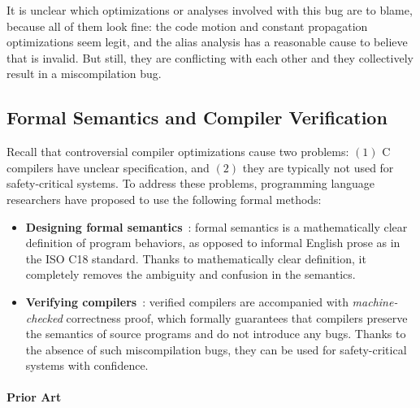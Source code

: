\noindent It is unclear which optimizations or analyses involved with this bug are to blame, because
all of them look fine: the code motion and constant propagation optimizations seem legit, and the
alias analysis has a reasonable cause to believe that  is invalid.  But still, they are
conflicting with each other and they collectively result in a miscompilation bug.



\subsection{Formal Semantics and Compiler Verification}

Recall that controversial compiler optimizations cause two problems: $(1)$ C compilers have unclear
specification, and $(2)$ they are typically not used for safety-critical systems.  To address these
problems, programming language researchers have proposed to use the following formal methods:

\begin{itemize}
\item \textbf{Designing formal semantics}~\cite{norrish1998c,leroy:compcert,ellison2012executable}:
  formal semantics is a mathematically clear definition of program behaviors, as opposed to informal
  English prose as in the ISO C18 standard.  Thanks to mathematically clear definition, it
  completely removes the ambiguity and confusion in the semantics.

\item \textbf{Verifying compilers}~\cite{compcert,vellvm}: verified compilers are accompanied with
  \emph{machine-checked} correctness proof, which formally guarantees that compilers preserve the
  semantics of source programs and do not introduce any bugs.  Thanks to the absence of such
  miscompilation bugs, they can be used for safety-critical systems with confidence.
\end{itemize}


\paragraph{Prior Art}

